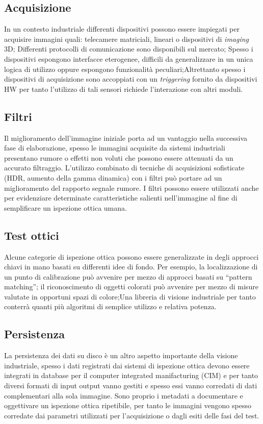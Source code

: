 \subsection{Acquisizione}
In un contesto industriale differenti dispositivi possono essere impiegati per acquisire immagini quali: telecamere matriciali, lineari
o dispositivi di \emph{imaging} 3D; Differenti protocolli di comunicazione sono disponibili sul mercato; Spesso i dispositivi
espongono interfacce eterogenee, difficili da generalizzare in un unica logica di utilizzo oppure espongono funzionalità peculiari;Altrettanto spesso i dispositivi di acquisizione sono accoppiati con un \emph{triggering} fornito da dispositivi HW per tanto l'utilizzo di tali sensori richiede l'interazione con altri moduli.

\subsection{Filtri}
Il miglioramento dell'immagine iniziale porta ad un vantaggio nella successiva fase di elaborazione, spesso le immagini acquisite da sistemi industriali presentano rumore o effetti non voluti che possono essere attenuati da un accurato filtraggio. 
L'utilizzo combinato di tecniche di acquisizioni sofisticate (HDR, aumento della gamma dinamica) con i filtri può portare ad un miglioramento del rapporto segnale rumore. I filtri possono essere utilizzati anche per evidenziare determinate caratteristiche salienti nell'immagine al fine di semplificare un ispezione ottica umana.  

\subsection{Test ottici}
Alcune categorie di ispezione ottica possono essere generalizzate in degli approcci chiavi in mano basati su differenti idee di fondo. Per esempio, la localizzazione di un punto di calibrazione può avvenire per mezzo di approcci basati su ``pattern matching''; il riconoscimento di oggetti colorati può avvenire per mezzo di misure valutate in opportuni spazi di colore;Una libreria di visione industriale per tanto conterrà quanti più algoritmi di semplice utilizzo e relativa potenza.

\subsection{Persistenza}
La persistenza dei dati su disco è un altro aspetto importante della visione industriale, spesso i dati registrati dai sistemi di ispezione ottica devono essere integrati in database per il computer integrated manifacturing (CIM) e per tanto diversi formati di input output vanno gestiti e spesso essi vanno corredati di dati complementari alla sola immagine. Sono proprio i metadati a documentare e oggettivare un ispezione ottica ripetibile, per tanto le immagini vengono spesso corredate dai parametri utilizzati per l'acquisizione o dagli esiti delle fasi del test.

